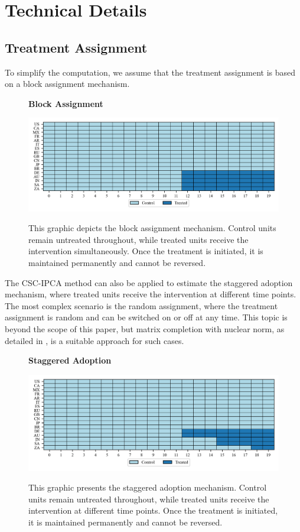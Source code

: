 \documentclass[12pt]{article}
\begin{document}
\section{Technical Details}
\label{sec: appendix}

\subsection{Treatment Assignment}
\label{app: treatment assignment}

To simplify the computation, we assume that the treatment assignment is based on a block assignment mechanism. 

\begin{figure}[!ht]
\centering
\caption{\textbf{Block Assignment}}
\includegraphics{figs/block_assignment.png}
\label{app: block assignment}
\caption*{\footnotesize{This graphic depicts the block assignment mechanism. Control units remain untreated throughout, while treated units receive the intervention simultaneously. Once the treatment is initiated, it is maintained permanently and cannot be reversed.}}
\end{figure}

The CSC-IPCA method can also be applied to estimate the staggered adoption mechanism, where treated units receive the intervention at different time points. The most complex scenario is the random assignment, where the treatment assignment is random and can be switched on or off at any time. This topic is beyond the scope of this paper, but matrix completion with nuclear norm, as detailed in \cite{athey2021matrix}, is a suitable approach for such cases.

\begin{figure}[!ht]
\centering
\caption{\textbf{Staggered Adoption}}
\includegraphics{figs/staggered_adoption.png}
\label{app: staggered adoption}
\caption*{\footnotesize{This graphic presents the staggered adoption mechanism. Control units remain untreated throughout, while treated units receive the intervention at different time points. Once the treatment is initiated, it is maintained permanently and cannot be reversed.}}
\end{figure}
\end{document}
